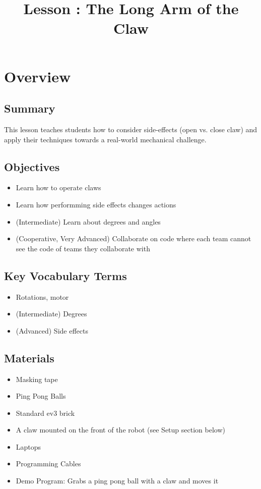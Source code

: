 \documentclass{lessonplan}
\title{Lesson \lessonNumber: The Long Arm of the Claw}
\author{\linkHome}
\date{}
\begin{document}
\maketitle

\section{Overview}
\subsection{Summary}
This lesson teaches students how to consider side-effects (open vs. close claw) and apply their techniques towards  a real-world mechanical challenge.

\subsection{Objectives}
\begin{itemize}
	\item Learn how to operate claws
	\item Learn how performming side effects changes actions
	\item (Intermediate) Learn about degrees and angles
	\item (Cooperative, Very Advanced) Collaborate on code where each team cannot see the code of teams they collaborate with
\end{itemize}
\subsection{Key Vocabulary Terms}
\begin{itemize}
	\item Rotations, motor
	\item (Intermediate) Degrees
	\item (Advanced) Side effects
\end{itemize}
\subsection{Materials}
\begin{itemize}
	\item Masking tape
	\item Ping Pong Balls
	\item Standard ev3 brick
	\item A claw mounted on the front  of the robot (see Setup section below)
	\item Laptops
	\item Programming Cables
	\item Demo Program: Grabs a ping pong ball with a claw and moves it
\end{itemize}
\end{document}
